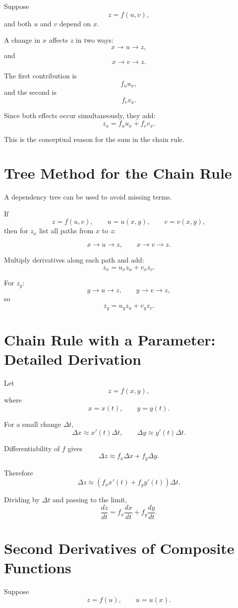 \documentclass[11pt,oneside]{book}
\theoremstyle{studentthm}
\theoremstyle{definition}
\begin{document}
Suppose
\[
z=f(u,v),
\]
and both \(u\) and \(v\) depend on \(x\).

A change in \(x\) affects \(z\) in two ways:
\[
x\longrightarrow u\longrightarrow z,
\]
and
\[
x\longrightarrow v\longrightarrow z.
\]

The first contribution is
\[
f_u u_x,
\]
and the second is
\[
f_v v_x.
\]

Since both effects occur simultaneously, they add:
\[
z_x=f_u u_x+f_v v_x.
\]

This is the conceptual reason for the sum in the chain rule.

\section{Tree Method for the Chain Rule}

A dependency tree can be used to avoid missing terms.

If
\[
z=f(u,v),
\qquad
u=u(x,y),
\qquad
v=v(x,y),
\]
then for \(z_x\) list all paths from \(x\) to \(z\):

\[
x\to u\to z,
\qquad
x\to v\to z.
\]

Multiply derivatives along each path and add:
\[
z_x
=
u_xz_u+v_xz_v.
\]

For \(z_y\):
\[
y\to u\to z,
\qquad
y\to v\to z,
\]
so
\[
z_y
=
u_yz_u+v_yz_v.
\]

\section{Chain Rule with a Parameter: Detailed Derivation}

Let
\[
z=f(x,y),
\]
where
\[
x=x(t),\qquad y=y(t).
\]

For a small change \(\Delta t\),
\[
\Delta x\approx x'(t)\Delta t,
\qquad
\Delta y\approx y'(t)\Delta t.
\]

Differentiability of \(f\) gives
\[
\Delta z
\approx
f_x\Delta x+f_y\Delta y.
\]

Therefore
\[
\Delta z
\approx
\left(
f_xx'(t)+f_yy'(t)
\right)\Delta t.
\]

Dividing by \(\Delta t\) and passing to the limit,
\[
\frac{dz}{dt}
=
f_x\frac{dx}{dt}
+
f_y\frac{dy}{dt}.
\]

\section{Second Derivatives of Composite Functions}

Suppose
\[
z=f(u),
\qquad
u=u(x).
\]
\end{document}
